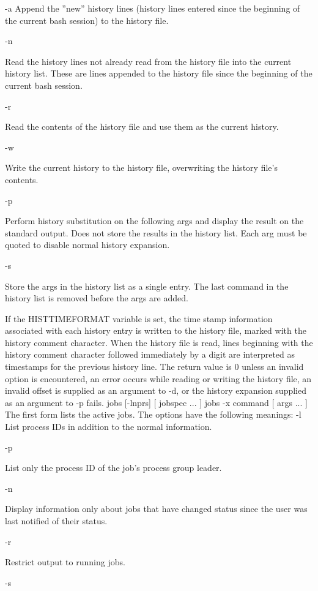 -a
Append the ''new'' history lines (history lines entered since the beginning of the current bash session) to the history file.

-n

Read the history lines not already read from the history file into the current history list. These are lines appended to the history file since the beginning of the current bash session.

-r

Read the contents of the history file and use them as the current history.

-w

Write the current history to the history file, overwriting the history file's contents.

-p

Perform history substitution on the following args and display the result on the standard output. Does not store the results in the history list. Each arg must be quoted to disable normal history expansion.

-s

Store the args in the history list as a single entry. The last command in the history list is removed before the args are added.

If the HISTTIMEFORMAT variable is set, the time stamp information associated with each history entry is written to the history file, marked with the history comment character. When the history file is read, lines beginning with the history comment character followed immediately by a digit are interpreted as timestamps for the previous history line. The return value is 0 unless an invalid option is encountered, an error occurs while reading or writing the history file, an invalid offset is supplied as an argument to -d, or the history expansion supplied as an argument to -p fails.
jobs [-lnprs] [ jobspec ... ]
jobs -x command [ args ... ]
The first form lists the active jobs. The options have the following meanings:
-l
List process IDs in addition to the normal information.

-p

List only the process ID of the job's process group leader.

-n

Display information only about jobs that have changed status since the user was last notified of their status.

-r

Restrict output to running jobs.

-s

